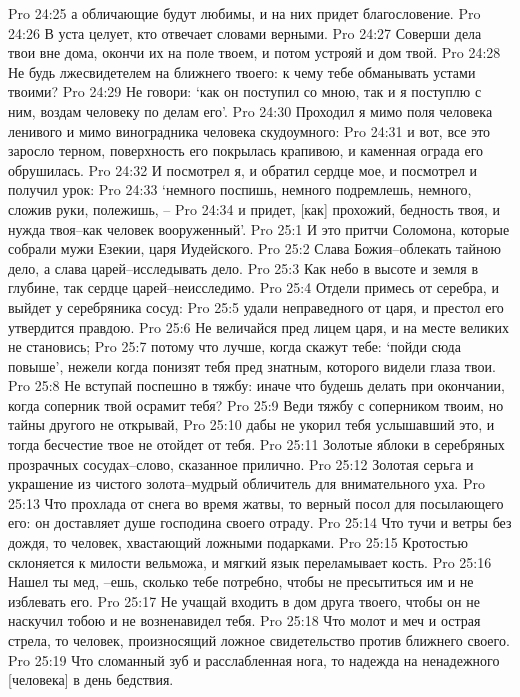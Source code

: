 Pro 24:25  а обличающие будут любимы, и на них придет благословение.
Pro 24:26  В уста целует, кто отвечает словами верными.
Pro 24:27  Соверши дела твои вне дома, окончи их на поле твоем, и потом устрояй и дом твой.
Pro 24:28  Не будь лжесвидетелем на ближнего твоего: к чему тебе обманывать устами твоими?
Pro 24:29  Не говори: `как он поступил со мною, так и я поступлю с ним, воздам человеку по делам его'.
Pro 24:30  Проходил я мимо поля человека ленивого и мимо виноградника человека скудоумного:
Pro 24:31  и вот, все это заросло терном, поверхность его покрылась крапивою, и каменная ограда его обрушилась.
Pro 24:32  И посмотрел я, и обратил сердце мое, и посмотрел и получил урок:
Pro 24:33  `немного поспишь, немного подремлешь, немного, сложив руки, полежишь, --
Pro 24:34  и придет, [как] прохожий, бедность твоя, и нужда твоя--как человек вооруженный'.
Pro 25:1  И это притчи Соломона, которые собрали мужи Езекии, царя Иудейского.
Pro 25:2  Слава Божия--облекать тайною дело, а слава царей--исследывать дело.
Pro 25:3  Как небо в высоте и земля в глубине, так сердце царей--неисследимо.
Pro 25:4  Отдели примесь от серебра, и выйдет у серебряника сосуд:
Pro 25:5  удали неправедного от царя, и престол его утвердится правдою.
Pro 25:6  Не величайся пред лицем царя, и на месте великих не становись;
Pro 25:7  потому что лучше, когда скажут тебе: `пойди сюда повыше', нежели когда понизят тебя пред знатным, которого видели глаза твои.
Pro 25:8  Не вступай поспешно в тяжбу: иначе что будешь делать при окончании, когда соперник твой осрамит тебя?
Pro 25:9  Веди тяжбу с соперником твоим, но тайны другого не открывай,
Pro 25:10  дабы не укорил тебя услышавший это, и тогда бесчестие твое не отойдет от тебя.
Pro 25:11  Золотые яблоки в серебряных прозрачных сосудах--слово, сказанное прилично.
Pro 25:12  Золотая серьга и украшение из чистого золота--мудрый обличитель для внимательного уха.
Pro 25:13  Что прохлада от снега во время жатвы, то верный посол для посылающего его: он доставляет душе господина своего отраду.
Pro 25:14  Что тучи и ветры без дождя, то человек, хвастающий ложными подарками.
Pro 25:15  Кротостью склоняется к милости вельможа, и мягкий язык переламывает кость.
Pro 25:16  Нашел ты мед, --ешь, сколько тебе потребно, чтобы не пресытиться им и не изблевать его.
Pro 25:17  Не учащай входить в дом друга твоего, чтобы он не наскучил тобою и не возненавидел тебя.
Pro 25:18  Что молот и меч и острая стрела, то человек, произносящий ложное свидетельство против ближнего своего.
Pro 25:19  Что сломанный зуб и расслабленная нога, то надежда на ненадежного [человека] в день бедствия.

